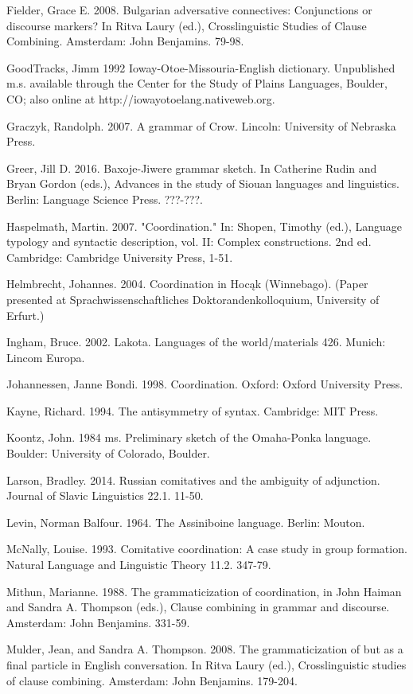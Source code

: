 \documentclass[output=paper]{LSP/langsci}
\begin{document}
\begin{reflist}
Fielder, Grace E. 2008. Bulgarian adversative connectives: Conjunctions or discourse markers? In Ritva Laury (ed.), Crosslinguistic Studies of Clause Combining. Amsterdam: John Benjamins. 79-98.

GoodTracks, Jimm 1992 Ioway-Otoe-Missouria-English dictionary. Unpublished m.s. available through the Center for the Study of Plains Languages, Boulder, CO; also online at http://iowayotoelang.nativeweb.org.

Graczyk, Randolph. 2007. A grammar of Crow. Lincoln: University of Nebraska Press.

Greer, Jill D. 2016. Baxoje-Jiwere grammar sketch. In Catherine Rudin and Bryan Gordon (eds.), Advances in the study of Siouan languages and linguistics. Berlin: Language Science Press. ???-???.

Haspelmath, Martin. 2007. "Coordination." In: Shopen, Timothy (ed.), Language typology and syntactic description, vol. II: Complex constructions. 2nd ed. Cambridge: Cambridge University Press, 1-51. 

Helmbrecht, Johannes. 2004. Coordination in Hoc\k{a}k (Winnebago). (Paper presented at Sprachwissenschaftliches Doktorandenkolloquium, University of Erfurt.)

Ingham, Bruce. 2002. Lakota. Languages of the world/materials 426. Munich: Lincom Europa.

Johannessen, Janne Bondi. 1998. Coordination. Oxford: Oxford University Press.

Kayne, Richard. 1994. The antisymmetry of syntax. Cambridge: MIT Press.

Koontz, John. 1984 ms. Preliminary sketch of the Omaha-Ponka language. Boulder: University of Colorado, Boulder. 

Larson, Bradley. 2014. Russian comitatives and the ambiguity of adjunction. Journal of Slavic Linguistics 22.1. 11-50.

Levin, Norman Balfour. 1964. The Assiniboine language. Berlin: Mouton.

McNally, Louise. 1993. Comitative coordination: A case study in group formation. Natural Language and Linguistic Theory 11.2. 347-79.

Mithun, Marianne. 1988. The grammaticization of coordination, in John Haiman and Sandra A. Thompson (eds.), Clause combining in grammar and discourse. Amsterdam: John Benjamins. 331-59.

Mulder, Jean, and Sandra A. Thompson. 2008. The grammaticization of but as a final particle in English conversation. In Ritva Laury (ed.), Crosslinguistic studies of clause combining. Amsterdam: John Benjamins. 179-204.


\end{reflist}
\end{document}
